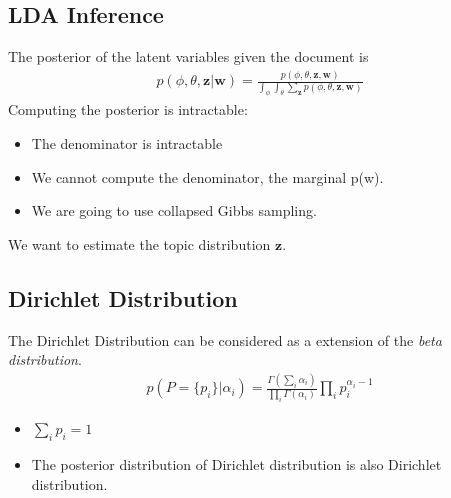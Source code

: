 \subsection{LDA Inference}
The posterior of the latent variables given the document is
\begin{align*}
	p(\phi, \theta, \mathbf{z}|\mathbf{w}) = \frac{p(\phi, \theta, \mathbf{z},\mathbf{w})}{\int_{\phi}\int_{\theta}\sum_{\mathbf{z}}p(\phi, \theta, \mathbf{z},\mathbf{w})}
\end{align*}
Computing the posterior is intractable:
\begin{itemize}
	\item The denominator is intractable
	\item We cannot compute the denominator, the marginal p(w).
	\item We are going to use collapsed Gibbs sampling. 
\end{itemize}

We want to estimate the topic distribution $\mathbf{z}$. 

\subsection{Dirichlet Distribution}
The Dirichlet Distribution can be considered as a extension of the \textit{beta distribution}. 
\begin{align}
	p(P=\{p_i\}|\alpha_i) = \frac{\Gamma(\sum_i\alpha_i)}{\prod_i\Gamma(\alpha_i)}\prod_ip_i^{\alpha_i-1}
	\label{eq:dirichlet_dist}
\end{align}
\begin{itemize}
	\item $\sum_ip_i = 1$
	\item The posterior distribution of Dirichlet distribution is also Dirichlet distribution. 
\end{itemize}
